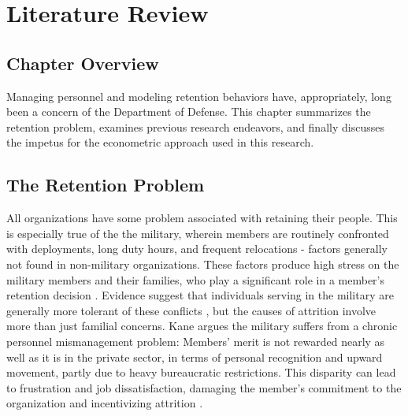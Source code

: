 \documentclass[12pt,letterpaper,toc=flat,oneside]{report}
\theoremstyle{definition}
\theoremstyle{definition}
\theoremstyle{definition}
\theoremstyle{remark}
\begin{document}
\newpage

\hypertarget{literature-review}{%
\chapter{Literature Review}\label{literature-review}}

\hypertarget{chapter-overview}{%
\section{Chapter Overview}\label{chapter-overview}}

Managing personnel and modeling retention behaviors have, appropriately,
long been a concern of the Department of Defense. This chapter
summarizes the retention problem, examines previous research endeavors,
and finally discusses the impetus for the econometric approach used in
this research.

\hypertarget{the-retention-problem}{%
\section{The Retention Problem}\label{the-retention-problem}}

All organizations have some problem associated with retaining their
people. This is especially true of the the military, wherein members are
routinely confronted with deployments, long duty hours, and frequent
relocations - factors generally not found in non-military organizations.
These factors produce high stress on the military members and their
families, who play a significant role in a member's retention decision
\cite{fugita-lakhani-1991}. Evidence suggest that individuals serving in
the military are generally more tolerant of these conflicts
\cite{capon-etal-2007}, but the causes of attrition involve more than
just familial concerns. Kane \cite{kane-2012} argues the military
suffers from a chronic personnel mismanagement problem: Members' merit
is not rewarded nearly as well as it is in the private sector, in terms
of personal recognition and upward movement, partly due to heavy
bureaucratic restrictions. This disparity can lead to frustration and
job dissatisfaction, damaging the member's commitment to the
organization and incentivizing attrition \cite{capon-etal-2007}.
\end{document}
